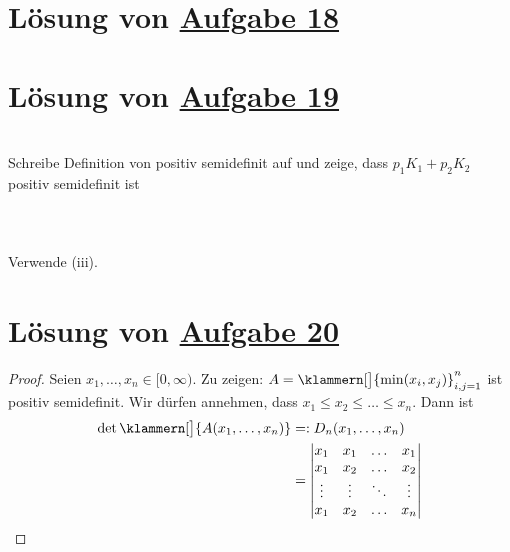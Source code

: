 \section{Lösung von 
	\texorpdfstring{\hyperref[aufg:18]{Aufgabe 18}}{}
}\label{loes:18}

\section{Lösung von 
	\texorpdfstring{\hyperref[aufg:19]{Aufgabe 19}}{}
}\label{loes:19}

\\
Schreibe Definition von positiv semidefinit auf und zeige, dass $p_1 K_1+p_2 K_2$ positiv semidefinit ist\nl
{}\\
\\
\\
\\
Verwende (iii).

\section{Lösung von 
	\texorpdfstring{\hyperref[aufg:20]{Aufgabe 20}}{}
}\label{loes:20}

\begin{proof}
	Seien $x_1,\ldots,x_n\in[0,\infty)$.
	Zu zeigen: $A=\klammern[\big]{\min(x_i,x_j)}_{i,j=1}^n$ ist positiv semidefinit.
	Wir dürfen annehmen, dass $x_1\leq x_2\leq\ldots\leq x_n$.
	Dann ist
	\begin{align*}
		\det\klammern[\big]{A(x_1,\ldots,x_n)}
		&=:D_n(x_1,\ldots,x_n)\\
		&=\begin{vmatrix}
			x_1 & x_1 & \ldots & x_1\\
			x_1 & x_2 & \ldots & x_2\\
			\vdots & \vdots & \ddots & \vdots\\
			x_1 & x_2 & \ldots & x_n
		\end{vmatrix}
	\end{align*}
\end{proof}
